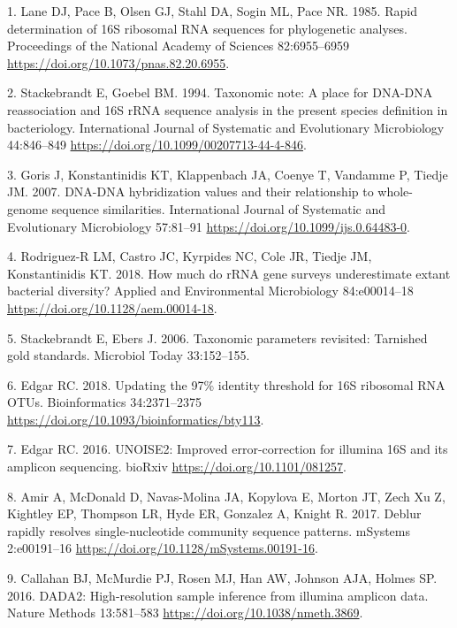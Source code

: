 \documentclass[
]{article}
\newenvironment{cslreferences}%
  {}%
  {\par}
\begin{document}
\hypertarget{refs}{}
\begin{cslreferences}
\leavevmode\hypertarget{ref-Lane1985}{}%
1. Lane DJ, Pace B, Olsen GJ, Stahl DA, Sogin ML, Pace NR. 1985. Rapid
determination of 16S ribosomal RNA sequences for phylogenetic analyses.
Proceedings of the National Academy of Sciences 82:6955--6959
\url{https://doi.org/10.1073/pnas.82.20.6955}.

\leavevmode\hypertarget{ref-Stackebrandt1994}{}%
2. Stackebrandt E, Goebel BM. 1994. Taxonomic note: A place for DNA-DNA
reassociation and 16S rRNA sequence analysis in the present species
definition in bacteriology. International Journal of Systematic and
Evolutionary Microbiology 44:846--849
\url{https://doi.org/10.1099/00207713-44-4-846}.

\leavevmode\hypertarget{ref-Goris2007}{}%
3. Goris J, Konstantinidis KT, Klappenbach JA, Coenye T, Vandamme P,
Tiedje JM. 2007. DNA-DNA hybridization values and their relationship to
whole-genome sequence similarities. International Journal of Systematic
and Evolutionary Microbiology 57:81--91
\url{https://doi.org/10.1099/ijs.0.64483-0}.

\leavevmode\hypertarget{ref-RodriguezR2018}{}%
4. Rodriguez-R LM, Castro JC, Kyrpides NC, Cole JR, Tiedje JM,
Konstantinidis KT. 2018. How much do rRNA gene surveys underestimate
extant bacterial diversity? Applied and Environmental Microbiology
84:e00014--18 \url{https://doi.org/10.1128/aem.00014-18}.

\leavevmode\hypertarget{ref-Stackebrandt2006}{}%
5. Stackebrandt E, Ebers J. 2006. Taxonomic parameters revisited:
Tarnished gold standards. Microbiol Today 33:152--155.

\leavevmode\hypertarget{ref-Edgar2018}{}%
6. Edgar RC. 2018. Updating the 97\% identity threshold for 16S
ribosomal RNA OTUs. Bioinformatics 34:2371--2375
\url{https://doi.org/10.1093/bioinformatics/bty113}.

\leavevmode\hypertarget{ref-Edgar2016}{}%
7. Edgar RC. 2016. UNOISE2: Improved error-correction for illumina 16S
and its amplicon sequencing. bioRxiv
\url{https://doi.org/10.1101/081257}.

\leavevmode\hypertarget{ref-Amir2017}{}%
8. Amir A, McDonald D, Navas-Molina JA, Kopylova E, Morton JT, Zech Xu
Z, Kightley EP, Thompson LR, Hyde ER, Gonzalez A, Knight R. 2017. Deblur
rapidly resolves single-nucleotide community sequence patterns. mSystems
2:e00191--16 \url{https://doi.org/10.1128/mSystems.00191-16}.

\leavevmode\hypertarget{ref-Callahan2016}{}%
9. Callahan BJ, McMurdie PJ, Rosen MJ, Han AW, Johnson AJA, Holmes SP.
2016. DADA2: High-resolution sample inference from illumina amplicon
data. Nature Methods 13:581--583
\url{https://doi.org/10.1038/nmeth.3869}.


\end{cslreferences}
\end{document}
